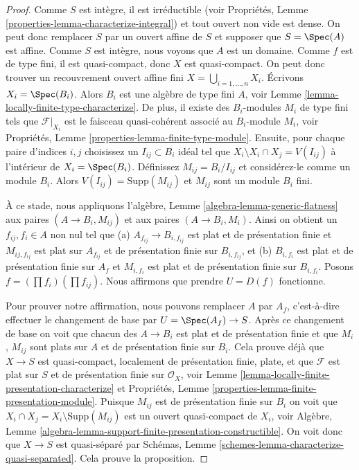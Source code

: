 \begin{proof}
Comme $S$ est intègre, il est irréductible
(voir Propriétés, Lemme \ref{properties-lemma-characterize-integral}) et tout ouvert non vide
est dense. On peut donc remplacer $S$ par un
ouvert affine de $S$ et supposer que $S = \Spec(A)$ est affine.
Comme $S$ est intègre, nous voyons que $A$
est un domaine. Comme $f$ est de type fini, il est quasi-compact,
donc $X$ est quasi-compact. On peut
donc trouver un recouvrement ouvert affine fini $X = \bigcup_{i = 1, \ldots, n} X_i$.
Écrivons $X_i = \Spec(B_i)$. Alors $B_i$ est une algèbre
de type fini $A$, voir Lemme \ref{lemma-locally-finite-type-characterize}. De
plus, il existe des $B_i$-modules
$M_i$ de type fini tels que $\mathcal{F}|_{X_i}$ est le
faisceau quasi-cohérent associé au $B_i$-module $M_i$,
voir Propriétés, Lemme \ref{properties-lemma-finite-type-module}. Ensuite,
pour chaque paire d'indices $i, j$ choisissez un $I_{ij} \subset B_i$
idéal tel que $X_i \setminus X_i \cap X_j = V(I_{ij})$ à l'intérieur de $X_i = \Spec(B_i)$.
Définissez $M_{ij} = B_i/I_{ij}$ et considérez-le comme
un module $B_i$. Alors $V(I_{ij}) = \text{Supp}(M_{ij})$ et $M_{ij}$
sont un module $B_i$ fini.

\medskip\noindent
À ce stade, nous
appliquons l'algèbre, Lemme \ref{algebra-lemma-generic-flatness} aux
paires $(A \to B_i, M_{ij})$ et aux paires $(A \to B_i, M_i)$.
Ainsi on obtient un $f_{ij}, f_i \in A$
non nul tel que (a) $A_{f_{ij}} \to B_{i, f_{ij}}$ est plat et de présentation
finie et $M_{ij, f_{ij}}$ est plat sur $A_{f_{ij}}$ et de
présentation finie sur $B_{i, f_{ij}}$, et (b) $B_{i, f_i}$ est plat
et de présentation finie sur $A_f$ et $M_{i, f_i}$
est plat et de présentation finie sur $B_{i, f_i}$. Posons $f = (\prod f_i) (\prod f_{ij})$.
Nous affirmons que
prendre $U = D(f)$ fonctionne.

\medskip\noindent
Pour prouver notre affirmation, nous pouvons remplacer
$A$ par $A_f$, c'est-à-dire effectuer
le changement de base par $U = \Spec(A_f) \to S$. Après ce changement
de base on voit que chacun des $A \to B_i$ est plat et de présentation
finie et que $M_i$, $M_{ij}$
sont plats sur $A$ et de présentation finie
sur $B_i$. Cela prouve déjà que $X \to S$ est quasi-compact,
localement de présentation finie, plate, et que $\mathcal{F}$
est plat sur $S$ et de présentation finie sur
$\mathcal{O}_X$,
voir Lemme \ref{lemma-locally-finite-presentation-characterize} et Propriétés, Lemme \ref{properties-lemma-finite-presentation-module}.
Puisque $M_{ij}$ est de présentation finie
sur $B_i$ on voit que $X_i \cap X_j = X_i \setminus \text{Supp}(M_{ij})$ est un ouvert
quasi-compact
de $X_i$, voir Algèbre, Lemme \ref{algebra-lemma-support-finite-presentation-constructible}. On voit
donc que $X \to S$ est quasi-séparé
par Schémas, Lemme \ref{schemes-lemma-characterize-quasi-separated}. Cela prouve
la proposition.
\end{proof}

